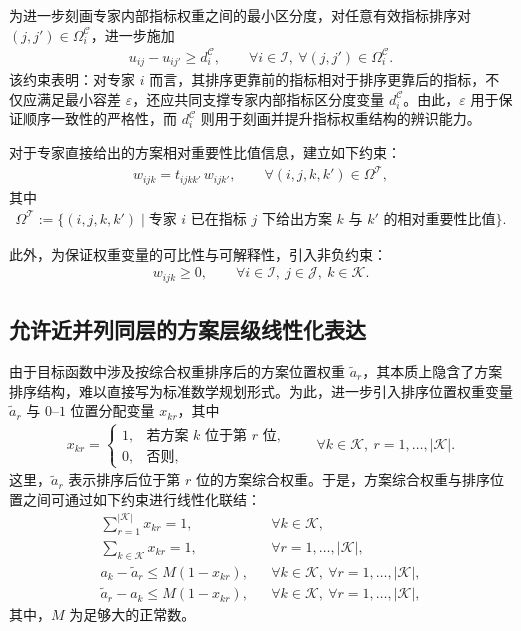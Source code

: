 \documentclass{article}
\begin{document}
为进一步刻画专家内部指标权重之间的最小区分度，对任意有效指标排序对 $(j,j')\in\Omega_i^{\mathcal C}$，进一步施加
\begin{align}
    u_{ij}-u_{ij'} \ge d_i^{\mathcal C},
    \qquad \forall i\in\mathcal I,\ \forall (j,j')\in\Omega_i^{\mathcal C}.
\end{align}
该约束表明：对专家 $i$ 而言，其排序更靠前的指标相对于排序更靠后的指标，不仅应满足最小容差 $\varepsilon$，还应共同支撑专家内部指标区分度变量 $d_i^{\mathcal C}$。由此，$\varepsilon$ 用于保证顺序一致性的严格性，而 $d_i^{\mathcal C}$ 则用于刻画并提升指标权重结构的辨识能力。

对于专家直接给出的方案相对重要性比值信息，建立如下约束：
\begin{align}
    w_{ijk}=t_{ijkk'}\,w_{ijk'},
    \qquad \forall (i,j,k,k')\in\Omega^{\mathcal T},
\end{align}
其中
\begin{align}
    \Omega^{\mathcal T}
    := \{(i,j,k,k')\mid \text{专家 } i \text{ 已在指标 } j \text{ 下给出方案 } k \text{ 与 } k' \text{ 的相对重要性比值}\}.
\end{align}

此外，为保证权重变量的可比性与可解释性，引入非负约束：
\begin{align}
    w_{ijk}\ge 0,
    \qquad \forall i\in\mathcal I,\ j\in\mathcal J,\ k\in\mathcal K.
\end{align}


\subsection{允许近并列同层的方案层级线性化表达}

由于目标函数中涉及按综合权重排序后的方案位置权重 $\tilde a_r$，其本质上隐含了方案排序结构，难以直接写为标准数学规划形式。为此，进一步引入排序位置权重变量 $\tilde a_r$ 与 $0$--$1$ 位置分配变量 $x_{kr}$，其中
\begin{align}
    x_{kr}=
    \begin{cases}
        1, & \text{若方案 } k \text{ 位于第 } r \text{ 位},\\
        0, & \text{否则},
    \end{cases}
    \qquad \forall k\in\mathcal K,\ r=1,\dots,|\mathcal K|.
\end{align}
这里，$\tilde a_r$ 表示排序后位于第 $r$ 位的方案综合权重。于是，方案综合权重与排序位置之间可通过如下约束进行线性化联结：
\begin{align}
    \sum_{r=1}^{|\mathcal K|} x_{kr}=1,
    && \forall k\in\mathcal K, \\
    \sum_{k\in\mathcal K} x_{kr}=1,
    && \forall r=1,\dots,|\mathcal K|, \\
    a_k-\tilde a_r \le M(1-x_{kr}),
    && \forall k\in\mathcal K,\ \forall r=1,\dots,|\mathcal K|, \\
    \tilde a_r-a_k \le M(1-x_{kr}),
    && \forall k\in\mathcal K,\ \forall r=1,\dots,|\mathcal K|,
\end{align}
其中，$M$ 为足够大的正常数。
\end{document}
